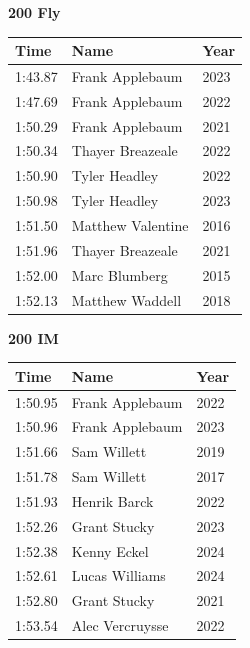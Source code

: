 \hfill
\begin{minipage}[t]{0.48\textwidth}
\centering
\textbf{\textcolor{teamprimary}{200 Fly}}\par
\vspace{0.5em}
\centering
\small
\renewcommand{\arraystretch}{1.0}
\setlength{\tabcolsep}{4pt}
\begin{tabular}{@{}p{1.8cm}p{3.0cm}p{1.0cm}@{}}
\toprule
\textbf{Time} & \textbf{Name} & \textbf{Year} \\
\midrule
1:43.87 & Frank Applebaum & 2023 \\
1:47.69 & Frank Applebaum & 2022 \\
1:50.29 & Frank Applebaum & 2021 \\
1:50.34 & Thayer Breazeale & 2022 \\
1:50.90 & Tyler Headley & 2022 \\
1:50.98 & Tyler Headley & 2023 \\
1:51.50 & Matthew Valentine & 2016 \\
1:51.96 & Thayer Breazeale & 2021 \\
1:52.00 & Marc Blumberg & 2015 \\
1:52.13 & Matthew Waddell & 2018 \\
\bottomrule
\end{tabular}
\end{minipage}
\vspace{1.2em}
\noindent\begin{minipage}[t]{0.48\textwidth}
\centering
\textbf{\textcolor{teamprimary}{200 IM}}\par
\vspace{0.5em}
\centering
\small
\renewcommand{\arraystretch}{1.0}
\setlength{\tabcolsep}{4pt}
\begin{tabular}{@{}p{1.8cm}p{3.0cm}p{1.0cm}@{}}
\toprule
\textbf{Time} & \textbf{Name} & \textbf{Year} \\
\midrule
1:50.95 & Frank Applebaum & 2022 \\
1:50.96 & Frank Applebaum & 2023 \\
1:51.66 & Sam Willett & 2019 \\
1:51.78 & Sam Willett & 2017 \\
1:51.93 & Henrik Barck & 2022 \\
1:52.26 & Grant Stucky & 2023 \\
1:52.38 & Kenny Eckel & 2024 \\
1:52.61 & Lucas Williams & 2024 \\
1:52.80 & Grant Stucky & 2021 \\
1:53.54 & Alec Vercruysse & 2022 \\
\bottomrule
\end{tabular}
\end{minipage}
